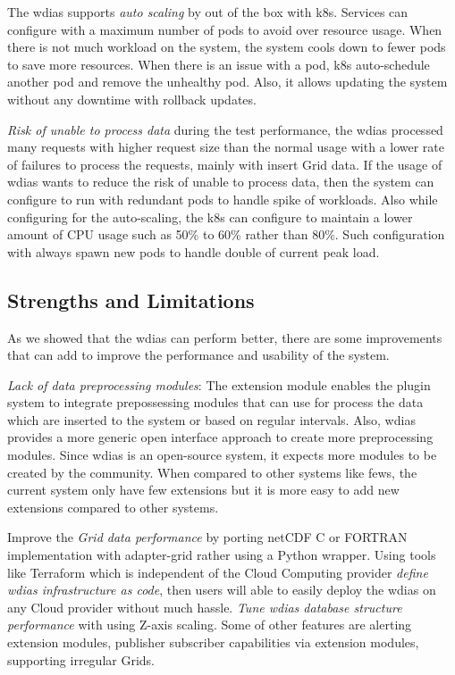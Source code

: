 \documentclass[conference]{IEEEtran}
\newcommand{\dbc}[1]{\todo[author=Dilum, inline, color=blue!40]{#1}}
\begin{document}
The \acrshort{wdias} supports \emph{auto scaling} by out of the box with \acrshort{k8s}. Services can configure with a maximum number of pods to avoid over resource usage. When there is not much workload on the system, the system cools down to fewer pods to save more resources. When there is an issue with a pod, \acrshort{k8s} auto-schedule another pod and remove the unhealthy pod. Also, it allows updating the system without any downtime with rollback updates.

\emph{Risk of unable to process data} during the test performance, the \acrshort{wdias} processed many requests with higher request size than the normal usage with a lower rate of failures to process the requests, mainly with insert Grid data. If the usage of \acrshort{wdias} wants to reduce the risk of unable to process data, then the system can configure to run with redundant pods to handle spike of workloads. Also while configuring for the auto-scaling, the \acrshort{k8s} can configure to maintain a lower amount of CPU usage such as 50\% to 60\% rather  than 80\%. Such configuration with always spawn new pods to handle double of current peak load.

\subsection{Strengths and Limitations}
\label{psubse:limitations}
\dbc{Make this the discussion and a sub-section of Sec. 4}

As we showed that the \acrshort{wdias} can perform better, there are some improvements that can add to improve the performance and usability of the system.

\emph{Lack of data preprocessing modules}:
The extension module enables the plugin system to integrate prepossessing modules that can use for process the data which are inserted to the system or based on regular intervals. Also, \acrshort{wdias} provides a more generic open interface approach to create more preprocessing modules. Since \acrshort{wdias} is an open-source system, it expects more modules to be created by the community. When compared to other systems like \acrshort{fews}, the current system only have few extensions but it is more easy to add new extensions compared to other systems.

Improve the \emph{Grid data performance} by porting \acrshort{netCDF} C or FORTRAN implementation with adapter-grid rather using a Python wrapper. Using tools like Terraform which is independent of the Cloud Computing provider \emph{define \acrshort{wdias} infrastructure as code}, then users will able to easily deploy the \acrshort{wdias} on any Cloud provider without much hassle. \emph{Tune \acrshort{wdias} database structure performance} with using Z-axis scaling. Some of other features are alerting extension modules, publisher subscriber capabilities via extension modules, supporting irregular Grids.
\end{document}
